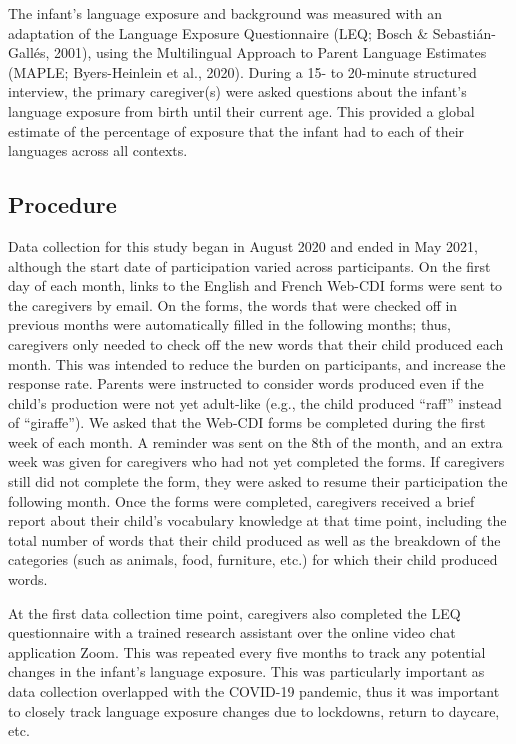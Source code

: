 \documentclass[
  ,man,floatsintext]{apa6}
\begin{document}
The infant's language exposure and background was measured with an adaptation of the Language Exposure Questionnaire (LEQ; Bosch \& Sebastián-Gallés, 2001), using the Multilingual Approach to Parent Language Estimates (MAPLE; Byers-Heinlein et al., 2020). During a 15- to 20-minute structured interview, the primary caregiver(s) were asked questions about the infant's language exposure from birth until their current age. This provided a global estimate of the percentage of exposure that the infant had to each of their languages across all contexts.

\hypertarget{procedure}{%
\subsection{Procedure}\label{procedure}}

Data collection for this study began in August 2020 and ended in May 2021, although the start date of participation varied across participants. On the first day of each month, links to the English and French Web-CDI forms were sent to the caregivers by email. On the forms, the words that were checked off in previous months were automatically filled in the following months; thus, caregivers only needed to check off the new words that their child produced each month. This was intended to reduce the burden on participants, and increase the response rate. Parents were instructed to consider words produced even if the child's production were not yet adult-like (e.g., the child produced ``raff'' instead of ``giraffe''). We asked that the Web-CDI forms be completed during the first week of each month. A reminder was sent on the 8th of the month, and an extra week was given for caregivers who had not yet completed the forms. If caregivers still did not complete the form, they were asked to resume their participation the following month. Once the forms were completed, caregivers received a brief report about their child's vocabulary knowledge at that time point, including the total number of words that their child produced as well as the breakdown of the categories (such as animals, food, furniture, etc.) for which their child produced words.

At the first data collection time point, caregivers also completed the LEQ questionnaire with a trained research assistant over the online video chat application Zoom. This was repeated every five months to track any potential changes in the infant's language exposure. This was particularly important as data collection overlapped with the COVID-19 pandemic, thus it was important to closely track language exposure changes due to lockdowns, return to daycare, etc.
\end{document}
